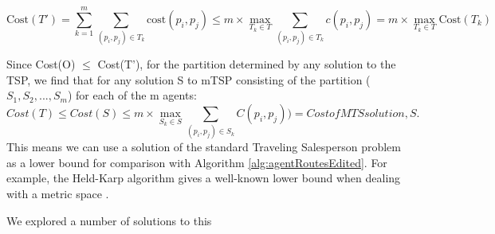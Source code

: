 \[\text{Cost}(T')=\sum\limits_{k=1}^{m}\sum\limits_{(p_i, p_j)\in T_k} \text{cost}(p_i, p_j) \leq m \times \max_{T_k \in T}
\sum\limits_{(p_i, p_j)\in T_k}c(p_i, p_j) = 
m \times \max_{T_k \in T} \text{Cost}(T_k)
\]

\noindent Since Cost(O) $\leq$ Cost(T'), for the partition determined by any solution to the TSP, we find that for any solution S to mTSP consisting of the partition ($S_1, S_2, ...,S_m$) for each of the m agents:\\

\[
Cost(T)
\leq Cost(S) \leq  m \times
\max_{S_k \in S}
\sum\limits_{(p_i, p_j)\in S_k}C(p_i, p_j)) = Cost of MTS solution, S.
\]
This means we can use a solution of the standard Traveling Salesperson problem as a lower bound for comparison with Algorithm \ref{alg:agentRoutesEdited}. For example, the Held-Karp algorithm gives a well-known lower bound when dealing with a metric space \cite{VALENZUELA1997157}.

We explored a number of solutions to this 



\subsubsection{}